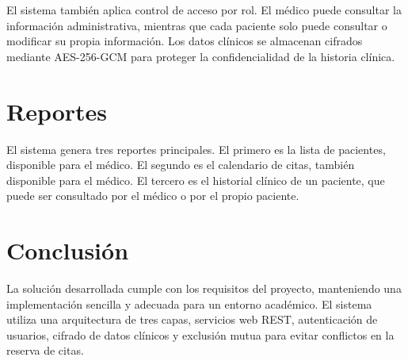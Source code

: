 \documentclass[12pt]{article}
\begin{document}
El sistema también aplica control de acceso por rol. El médico puede consultar la información administrativa, mientras que cada paciente solo puede consultar o modificar su propia información. Los datos clínicos se almacenan cifrados mediante AES-256-GCM para proteger la confidencialidad de la historia clínica.

\section{Reportes}

El sistema genera tres reportes principales. El primero es la lista de pacientes, disponible para el médico. El segundo es el calendario de citas, también disponible para el médico. El tercero es el historial clínico de un paciente, que puede ser consultado por el médico o por el propio paciente.

\section{Conclusión}

La solución desarrollada cumple con los requisitos del proyecto, manteniendo una implementación sencilla y adecuada para un entorno académico. El sistema utiliza una arquitectura de tres capas, servicios web REST, autenticación de usuarios, cifrado de datos clínicos y exclusión mutua para evitar conflictos en la reserva de citas.
\end{document}
